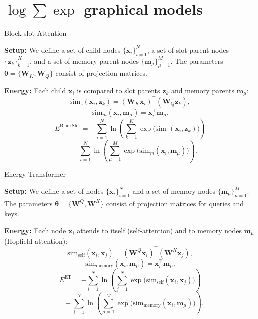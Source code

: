 \documentclass{beamer}
\begin{document}

\section{$\log \sum \exp$ graphical models}

\begin{frame}{Block-slot Attention}

    \textbf{Setup:}  
    We define a set of child nodes \(\{\bm{x}_i\}_{i=1}^N\), a set of slot parent nodes \(\{\bm{z}_k\}_{k=1}^K\), and a set of memory parent nodes \(\{\bm{m}_\mu\}_{\mu=1}^M\). The parameters \(\bm{\theta} = \{\bm{W}_K, \bm{W}_Q\}\) consist of projection matrices.
    
    \bigskip
    
    \textbf{Energy:}  
    Each child \(\bm{x}_i\) is compared to slot parents \(\bm{z}_k\) and memory parents \(\bm{m}_\mu\):
    \[
    \mathrm{sim}_z(\bm{x}_i, \bm{z}_k) = (\bm{W}_K \bm{x}_i)^\top (\bm{W}_Q \bm{z}_k),
    \]
    \[
    \mathrm{sim}_m(\bm{x}_i, \bm{m}_\mu) = \bm{x}_i^\top \bm{m}_\mu.
    \]
    \[
    E^{\mathrm{BlockSlot}}
    = -\sum_{i=1}^N 
    \ln \left(
    \sum_{k=1}^K \exp\bigl(\mathrm{sim}_z(\bm{x}_i, \bm{z}_k)\bigr)
    \right)  
    \]
    \[
    \quad -\sum_{i=1}^N 
    \ln \left(
    \sum_{\mu=1}^M \exp\bigl(\mathrm{sim}_m(\bm{x}_i, \bm{m}_\mu)\bigr)
    \right).
    \]
    
\end{frame}

\begin{frame}{Energy Transformer}

    \textbf{Setup:}  
    We define a set of nodes \(\{\bm{x}_i\}_{i=1}^N\) and a set of memory nodes \(\{\bm{m}_\mu\}_{\mu=1}^M\). The parameters \(\bm{\theta} = \{\bm{W}^Q, \bm{W}^K\}\) consist of projection matrices for queries and keys.
    
    \bigskip
    
    \textbf{Energy:}  
    Each node \(\bm{x}_i\) attends to itself (self-attention) and to memory nodes \(\bm{m}_\mu\) (Hopfield attention):
    \[
    \mathrm{sim}_{\text{self}}(\bm{x}_i, \bm{x}_j) = (\bm{W}^Q \bm{x}_i)^\top (\bm{W}^K \bm{x}_j),
    \]
    \[
    \mathrm{sim}_{\text{memory}}(\bm{x}_i, \bm{m}_\mu) = \bm{x}_i^\top \bm{m}_\mu.
    \]
    \[
    E^{\mathrm{ET}}
    =
    -\sum_{i=1}^N 
    \ln \left(
    \sum_{j=1}^N \exp\bigl(\mathrm{sim}_{\text{self}}(\bm{x}_i, \bm{x}_j)\bigr)
    \right)  
    \]
    \[
    \quad -\sum_{i=1}^N 
    \ln \left(
    \sum_{\mu=1}^M \exp\bigl(\mathrm{sim}_{\text{memory}}(\bm{x}_i, \bm{m}_\mu)\bigr)
    \right).
    \]
    
\end{frame}
\end{document}
